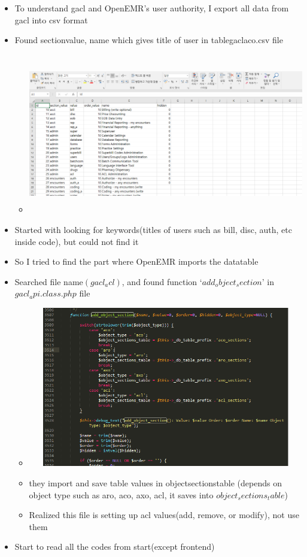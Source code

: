 \documentclass[paper=a4, fontsize=11pt]{scrartcl} %
\numberwithin{equation}{section} %
\numberwithin{figure}{section} %
\numberwithin{table}{section} %
\begin{document}
\begin{itemize}
\begin{itemize}
		\end{itemize}
	\item 	To understand gacl and OpenEMR's user authority, I export all data from gacl into csv format
	\item  Found sectionvalue, name which gives title of user in tablegaclaco.csv file	
		\begin{itemize}
		\item
		 \includegraphics[width = 20cm, height=7cm]{pictures/gacltableauth.png}
		\end{itemize}
	\item Started with looking for keywords(titles of users such as bill, disc, auth, etc inside code), but could not find it
	\item So I tried to find the part where OpenEMR imports the datatable
	\item Searched file name$(gacl_acl)$, and found function $‘add_object_section’$ in $gacl_api.class.php$ file
		\begin{itemize}
		\item
		 \includegraphics[width = 20cm, height=7cm]{pictures/addobject_func.png}
		\item they import and save table values in objectsectionstable (depends on object type such as aro, aco, axo, acl, it saves into $object_sections_table$)
		\item Realized this file is setting up acl values(add, remove, or modify), not use them
		\end{itemize}
	\item Start to read all the codes from start(except frontend)
		

\end{itemize}
\end{document}
